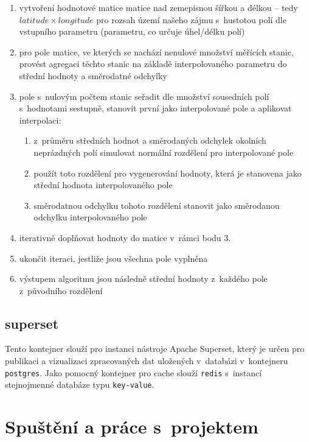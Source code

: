 \documentclass[10pt,a4paper,titlepage]{extarticle}
\begin{document}
    \begin{enumerate}
        \item vytvoření hodnotové matice matice nad zemepisnou šířkou a délkou -- tedy $latitude \times longitude$ pro
        rozsah území našeho zájmu s~hustotou polí dle vstupního parametru (parametru, co určuje úhel/délku
        polí)
        \item pro pole matice, ve kterých se nachází nenulové množství měřících stanic, provést agregaci těchto stanic
        na základě interpolovaného parametru do střední hodnoty a směrodatné odchylky
        \item pole s~nulovým počtem stanic seřadit dle množství sousedních polí s~hodnotami sestupně, stanovit první
        jako interpolované pole a aplikovat interpolaci:
        \begin{enumerate}
            \item z~průměru středních hodnot a směrodaných odchylek okolních neprázdných polí simulovat normální
            rozdělení pro interpolované pole
            \item použít toto rozdělení pro vygenerování hodnoty, která je stanovena jako střední hodnota
            interpolovaného pole
            \item směrodatnou odchylku tohoto rozdělení stanovit jako směrodanou odchylku interpolovaného pole
        \end{enumerate}
        \item iterativně doplňovat hodnoty do matice v~rámci bodu 3.
        \item ukončit iteraci, jestliže jsou všechna pole vyplněna
        \item výstupem algoritmu jsou následně střední hodnoty z~každého pole z~původního rozdělení
    \end{enumerate}

    \subsection{superset}

    Tento kontejner slouží pro instanci nástroje Apache Superset, který je určen pro publikaci a vizualizaci
    zpracovaných dat uložených v~databázi v~kontejneru \texttt{postgres}. Jako pomocný kontejner pro cache slouží
    \texttt{redis} s~instancí stejnojmenné databáze typu \texttt{key-value}.

    \section{Spuštění a práce s~projektem}
\end{document}
